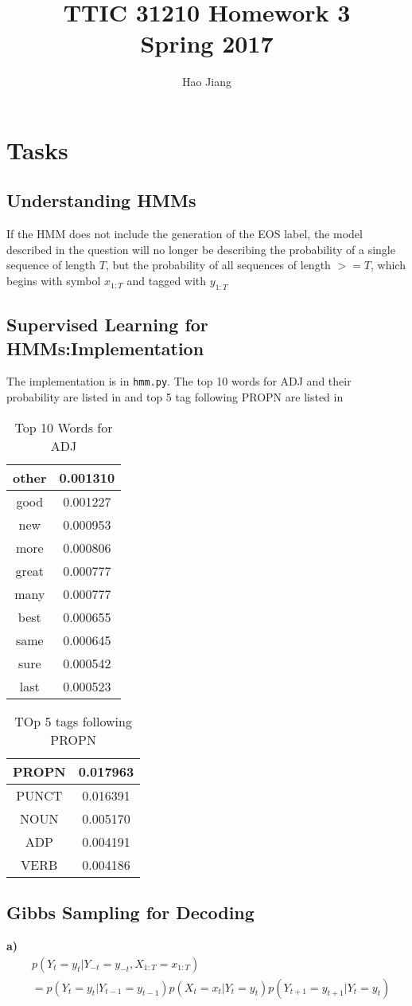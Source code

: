 \documentclass{article}
\title{TTIC 31210 Homework 3 \\ Spring 2017}
\author{Hao Jiang}
\begin{document}
\maketitle
\section{Tasks}
\subsection{Understanding HMMs}
If the HMM does not include the generation of the EOS label, the model described in the question
will no longer be describing the probability of a single sequence of length $T$, but the probability
of all sequences of length $>= T$, which begins with symbol $x_{1:T}$ and tagged with $y_{1:T}$

\subsection{Supervised Learning for HMMs:Implementation}

The implementation is in \texttt{hmm.py}. The top 10 words for ADJ and their probability are listed 
in  and top 5 tag following PROPN are listed in 
\begin{table}
\centering
\begin{tabular}{c|c}
other & 0.001310 \\\hline
good & 0.001227 \\\hline
new & 0.000953 \\\hline
more & 0.000806 \\\hline
great & 0.000777 \\\hline
many & 0.000777 \\\hline
best & 0.000655 \\\hline
same & 0.000645 \\\hline
sure & 0.000542 \\\hline
last & 0.000523 \\
\end{tabular}
\caption{Top 10 Words for ADJ}
\label{tab:top10adj}
\end{table}
\renewcommand{\arraystretch}{1.5}
\begin{table}
\centering
\begin{tabular}{c|c}
PROPN & 0.017963\\\hline
PUNCT & 0.016391\\\hline
NOUN & 0.005170\\\hline
ADP & 0.004191\\\hline
VERB & 0.004186\\\hline
\end{tabular}
\caption{TOp 5 tags following PROPN}
\label{tab:top5propn}
\end{table}

\subsection{Gibbs Sampling for Decoding}
\textbf{a)}
\begin{align*}
&p(Y_t = y_t|Y_{-t} = y_{-t}, X_{1:T} = x_{1:T}) \\&= p(Y_t = y_t|Y_{t-1}=y_{t-1})p(X_t = x_t | Y_t = y_t)p(Y_{t+1} = y_{t+1}|Y_t = y_t)
\end{align*}
\end{document}
